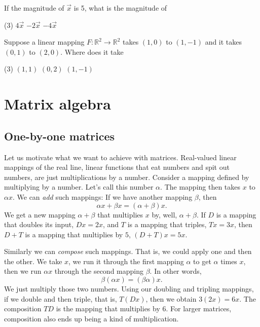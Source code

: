 \begin{exercise}
If the magnitude of $\vec{x}$ is 5, what is the magnitude of
\begin{tasks}(3)
\task
$4\vec{x}$
\task
$-2\vec{x}$
\task
$-4\vec{x}$
\end{tasks}
\end{exercise}

\begin{exercise}
Suppose a linear mapping $F \colon {\mathbb R}^2 \to {\mathbb R}^2$
takes $(1,0)$ to $(1,-1)$ and it takes $(0,1)$ to $(2,0)$.
Where does it take
\begin{tasks}(3)
\task
$(1,1)$
\task
$(0,2)$
\task
$(1,-1)$
\end{tasks}
\end{exercise}


\sectionnewpage
\section{Matrix algebra}
\label{matalg:section}



\subsection{One-by-one matrices}

Let us motivate what we want to achieve with matrices.
Real-valued linear mappings of the real line, linear functions
that eat numbers and spit out numbers, are just multiplications by a
number.  Consider a mapping defined by multiplying by a
number.  Let's call this number $\alpha$.   The mapping then takes $x$ to
$\alpha x$.  We can
\emph{add} such mappings:
If we have another mapping $\beta$, then
\begin{equation*}
\alpha x + \beta x = (\alpha + \beta) x .
\end{equation*}
We get a new mapping $\alpha+\beta$ that multiplies $x$ by, well,
$\alpha+\beta$.  If $D$ is a mapping that doubles its input,
$Dx = 2x$, and $T$ is a mapping that triples, $Tx = 3x$, then
$D+T$ is a mapping that multiplies by $5$, $(D+T)x = 5x$.

Similarly we can \emph{compose} such mappings.
That is, we could apply one and then the other.
We take $x$, we run it through
the first mapping $\alpha$ to get $\alpha$ times $x$, then we run
$\alpha x$ through the second mapping $\beta$.  In other words,
\begin{equation*}
\beta ( \alpha x ) = (\beta \alpha) x .
\end{equation*}
We just multiply those two numbers.  Using our doubling
and tripling mappings, if we double and then triple,
that is, $T(Dx)$, then
we obtain $3(2x) = 6x$.  The composition $TD$ is the mapping that multiplies
by $6$.  For larger matrices, composition also ends up being a kind of
multiplication.


